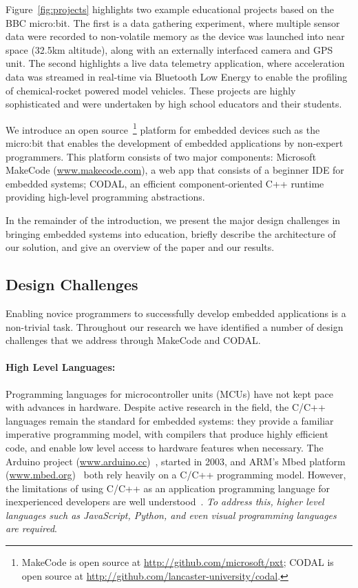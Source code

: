 Figure~\ref{fig:projects} highlights two example educational projects based on the BBC micro:bit. The first is a data gathering experiment, where multiple sensor data were recorded to non-volatile memory as the device was launched into near space (32.5km altitude), along with an externally interfaced camera and GPS unit. The second highlights a live data telemetry application, where acceleration data was streamed in real-time via Bluetooth Low Energy to enable the profiling of chemical-rocket powered model vehicles. These projects are highly sophisticated and were undertaken by high school educators and their students.

We introduce an open source~\footnote{
MakeCode is open source at \url{http://github.com/microsoft/pxt}; CODAL is open source at
\url{http://github.com/lancaster-university/codal}.} platform for embedded devices such as the micro:bit that enables the development of embedded applications by non-expert programmers. This platform consists of two major components: Microsoft MakeCode (\url{www.makecode.com}), a web app that consists of a beginner IDE for embedded
systems; CODAL, an efficient component-oriented C++ runtime
providing high-level programming abstractions.

In the remainder of the introduction, we present the major design challenges in
bringing embedded systems into education, briefly describe the
architecture of our solution, and give an overview of the
paper and our results.

\subsection{Design Challenges}
\label{sec:DesignChallenges}
Enabling novice programmers to successfully develop embedded applications is a non-trivial task. Throughout our research we have identified a number of design challenges that we address through MakeCode and CODAL.

\paragraph{High Level Languages:}
Programming languages for microcontroller units (MCUs) have not kept pace with advances in hardware. Despite active research in the field, the C/C++ languages remain the standard for embedded systems: they provide a familiar imperative programming model, with compilers that produce highly efficient code, and enable low level access to hardware features when necessary. The Arduino project (\url{www.arduino.cc})~\cite{buildingArduino2014}, started in 2003, and ARM's Mbed platform (\url{www.mbed.org})~\cite{ARMmbed} both rely heavily on a C/C++ programming model. However, the limitations of using C/C++ as an application programming language for inexperienced developers are well understood~\cite{blikstein2013gears}. \emph{To address this, higher level languages such as JavaScript, Python, and even visual programming languages are required}.

